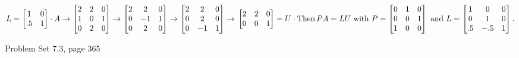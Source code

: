 \[L=\begin{bmatrix}1&0\\ .5&1\end{bmatrix}\cdot A\to\begin{bmatrix}2&2&0\\ 1&0&1\\ 0&2&0\end{bmatrix}\to\begin{bmatrix}2&2&0\\ 0&-1&1\\ 0&2&0\end{bmatrix}\to\begin{bmatrix}2&2&0\\ 0&2&0\\ 0&-1&1\end{bmatrix}\to\\ \begin{bmatrix}2&2&0\\ 0&0&1\end{bmatrix}=U\cdot\text{Then}\,PA=LU\text{ with }P=\begin{bmatrix}0&1&0\\ 0&0&1\\ 1&0&0\end{bmatrix}\text{ and }L=\begin{bmatrix}1&0&0\\ 0&1&0\\ .5&-.5&1\end{bmatrix}.\]

Problem Set 7.3, page 365

